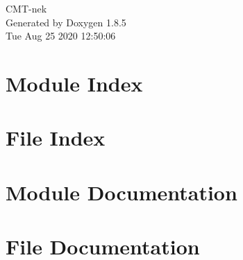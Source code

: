 \documentclass[twoside]{book}
\newcommand{\clearemptydoublepage}{%
  \newpage{\pagestyle{empty}\cleardoublepage}%
}
\begin{document}
\hypersetup{pageanchor=false}
\begin{titlepage}
\vspace*{7cm}
\begin{center}%
{\Large C\-M\-T-\/nek }\\
\vspace*{1cm}
{\large Generated by Doxygen 1.8.5}\\
\vspace*{0.5cm}
{\small Tue Aug 25 2020 12:50:06}\\
\end{center}
\end{titlepage}
\clearemptydoublepage
\tableofcontents
\clearemptydoublepage
{}
\hypersetup{pageanchor=true}



\chapter{Module Index}

\chapter{File Index}

\chapter{Module Documentation}











\chapter{File Documentation}













%
%
\newpage
{}
{}
\printindex
\end{document}
